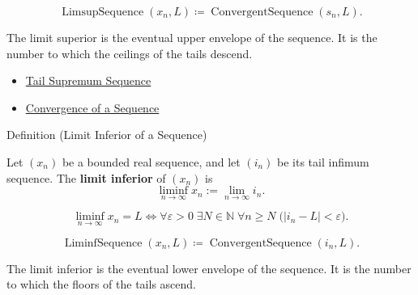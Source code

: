 \begin{remark*}
\[
\operatorname{LimsupSequence}(x_n,L)
\coloneqq
\operatorname{ConvergentSequence}(s_n,L).
\]
\end{remark*}

\begin{remark*}[Interpretation]
The limit superior is the eventual upper envelope of the sequence. It is the
number to which the ceilings of the tails descend.
\end{remark*}

\begin{remark*}[Dependencies]\hfill
\begin{itemize}
  \item \hyperref[def:tail-supremum-sequence]{Tail Supremum Sequence}
  \item \hyperref[def:convergent-sequence]{Convergence of a Sequence}
\end{itemize}
\end{remark*}


\begin{definitionbox}{Definition (Limit Inferior of a Sequence)}
\begin{definition}
\label{def:liminf-sequence}
Let $(x_n)$ be a bounded real sequence, and let $(i_n)$ be its tail
infimum sequence. The \textbf{limit inferior} of $(x_n)$ is
\[
  \liminf_{n\to\infty}x_n:=\lim_{n\to\infty}i_n.
\]
\end{definition}
\end{definitionbox}

\begin{remark*}
\[
\liminf_{n\to\infty}x_n=L
\Longleftrightarrow
\forall \varepsilon>0\;\exists N\in\mathbb{N}\;\forall n\ge N
\;\bigl(|i_n-L|<\varepsilon\bigr).
\]
\end{remark*}

\begin{remark*}
\[
\operatorname{LiminfSequence}(x_n,L)
\coloneqq
\operatorname{ConvergentSequence}(i_n,L).
\]
\end{remark*}

\begin{remark*}[Interpretation]
The limit inferior is the eventual lower envelope of the sequence. It is the
number to which the floors of the tails ascend.
\end{remark*}

